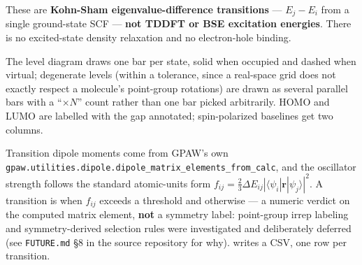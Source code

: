 \begin{calwarn}
These are \textbf{Kohn-Sham eigenvalue-difference transitions} --- $E_j -
E_i$ from a single ground-state SCF --- \textbf{not TDDFT or BSE excitation
energies}. There is no excited-state density relaxation and no
electron-hole binding.
\end{calwarn}

The level diagram draws one bar per state, solid when occupied and
dashed when virtual; degenerate levels (within a tolerance, since a
real-space grid does not exactly respect a molecule's point-group
rotations) are drawn as several parallel bars with a ``$\times N$'' count
rather than one bar picked arbitrarily. HOMO and LUMO are labelled with the
gap annotated; spin-polarized baselines get two columns.

Transition dipole moments come from GPAW's own
\texttt{gpaw.utilities.dipole.dipole\_matrix\_elements\_from\_calc}, and the
oscillator strength follows the standard atomic-units form $f_{ij} =
\frac{2}{3}\Delta E_{ij}|\langle\psi_i|\mathbf{r}|\psi_j\rangle|^2$. A
transition is  when $f_{ij}$ exceeds a threshold and
 otherwise --- a numeric verdict on the computed matrix
element, \textbf{not} a symmetry label: point-group irrep labeling and
symmetry-derived selection rules were investigated and deliberately
deferred (see \texttt{FUTURE.md} \S8 in the source repository for why).
 writes a CSV, one row per transition.
